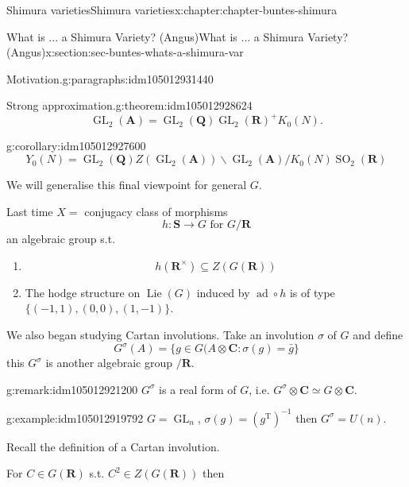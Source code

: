 \documentclass[oneside,10pt,]{book}
\numberwithin{equation}{section}
\DeclareMathOperator{\Lie}{Lie}
\newcommand{\inv}{^{-1}}
\newcommand{\QQ}{\mathbf{Q}}
\newcommand{\RR}{\mathbf{R}}
\newcommand{\CC}{\mathbf{C}}
\newcommand{\adeles}{\mathbf{A}}
\newcommand{\transpose}{\mathrm{T}}
\DeclareMathOperator{\ad}{ad}
\DeclareMathOperator{\GL}{GL}
\DeclareMathOperator{\specialorthogonal}{SO}
\begin{document}
\begin{chapterptx}{Shimura varieties}{}{Shimura varieties}{}{}{x:chapter:chapter-buntes-shimura}
\begin{sectionptx}{What is ... a Shimura Variety? (Angus)}{}{What is ... a Shimura Variety? (Angus)}{}{}{x:section:sec-buntes-whats-a-shimura-var}
\begin{paragraphs}{Motivation.}{g:paragraphs:idm105012931440}
\begin{equation*}
\end{equation*}
%
\begin{theorem}{Strong approximation.}{}{g:theorem:idm105012928624}%
%
\begin{equation*}
\GL_2(\adeles) = \GL_2(\QQ) \GL_2(\RR)^+ K_0(N)\text{.}
\end{equation*}
%
\end{theorem}
\begin{corollary}{}{}{g:corollary:idm105012927600}%
%
\begin{equation*}
Y_0(N) = \GL_2(\QQ)Z(\GL_2(\adeles)) \backslash \GL_2(\adeles) / K_0(N) \specialorthogonal_2(\RR)
\end{equation*}
%
\end{corollary}
We will generalise this final viewpoint for general \(G\).%
\end{paragraphs}%
\par
Last time \(X = \) conjugacy class of morphisms%
\begin{equation*}
h \colon \mathbf S \to G\text{ for } G/\RR
\end{equation*}
an algebraic group s.t.%
\begin{enumerate}
\item{}%
\begin{equation*}
h(\RR^\times)  \subseteq Z(G(\RR))
\end{equation*}
%
\item{}The hodge structure on \(\Lie(G)\) induced by \(\ad \circ h\) is of type \(\{(-1,1), (0,0), (1,-1)\}\).%
\end{enumerate}
%
\par
We also began studying Cartan involutions. Take an involution \(\sigma\) of \(G\) and define%
\begin{equation*}
G^\sigma(A) = \{ g\in G(A \otimes \CC : \sigma(g) = \bar g\}
\end{equation*}
this \(G^\sigma\) is another algebraic group \(/\RR\).%
\begin{remark}{}{g:remark:idm105012921200}%
\(G^\sigma\) is a real form of \(G\), i.e. \(G^\sigma \otimes \CC \simeq G \otimes \CC\).%
\end{remark}
\begin{example}{}{g:example:idm105012919792}%
\(G  =\GL_n\), \(\sigma(g) = (g^\transpose)\inv\) then \(G^\sigma =  U(n)\).%
\end{example}
Recall the definition of a Cartan involution.%
\par
For \(C \in G(\RR)\) s.t. \(C^2 \in Z(G(\RR))\) then%
\begin{equation*}

\end{equation*}
\end{sectionptx}
\end{chapterptx}
\end{document}
